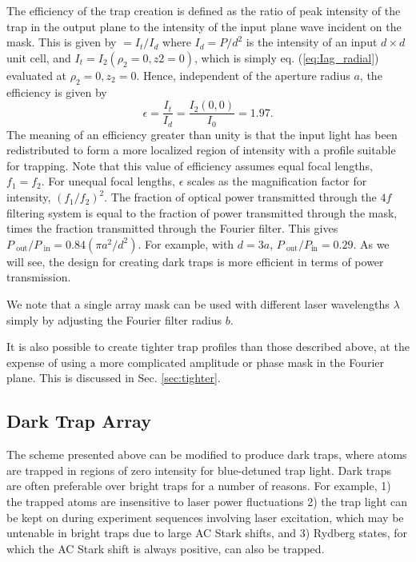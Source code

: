 The efficiency of the trap creation is defined as the ratio of peak intensity of the trap in the output plane to the intensity of the input plane wave incident on the mask. This is given by $=I_{t}/I_{d}$ where $I_{d} = P / d^{2}$ is the intensity of an input $d \times d$ unit cell, and $I_{t} = I_2(\rho_2=0,z2=0)$, which is simply  eq. (\ref{eq:Iag_radial}) evaluated at $\rho_2=0,z_2=0$. Hence, independent of the aperture radius $a$, the efficiency is given by
\begin{equation}\label{eq:brighteff}
    \epsilon = \frac{I_{t}}{I_{d}} = \frac{I_{2}\left(0,0\right)}{I_{0}}=1.97.
\end{equation}
The meaning of an efficiency greater than unity is that the input light has been redistributed to form a more localized region of intensity with a profile suitable for trapping. Note that this value of efficiency assumes equal focal lengths, $f_1=f_2$. For unequal focal lengths, $\epsilon$ scales as the magnification factor for intensity, $(f_1/f_2)^2$. 
The fraction of optical power transmitted through the $4f$ filtering system is equal to the fraction of power transmitted through the mask, times the fraction transmitted through the Fourier filter. This gives $ P_{\text{ out}}/P_{\text{ in}}= 0.84(\pi a^2/d^2)$. For example, with $d=3a$, $P_{\text{ out}}/P_{\text {in}}=0.29$. As we will see, the design for creating dark traps is  more efficient in terms of power transmission.

We note that a single array mask can be used with different laser wavelengths $\lambda$ simply by adjusting the Fourier filter radius $b$.

It is also possible to create tighter trap profiles than those described above, at the expense of using a  more complicated amplitude or phase mask in the Fourier plane\cite{Beguin2020}. This is discussed in Sec. \ref{sec:tighter}.

\subsection{Dark Trap Array}
The scheme presented above can be modified to produce dark traps, where atoms are trapped in regions of zero intensity for blue-detuned trap light. Dark traps are often preferable over bright traps for a number of reasons. For example, 1) the trapped atoms are insensitive to laser power fluctuations 2) the trap light can be kept on during experiment sequences involving laser excitation, which may be untenable in bright traps due to large AC Stark shifts, and 3) Rydberg states, for which the AC Stark shift is always positive, can also be trapped\cite{SZhang2011}.

